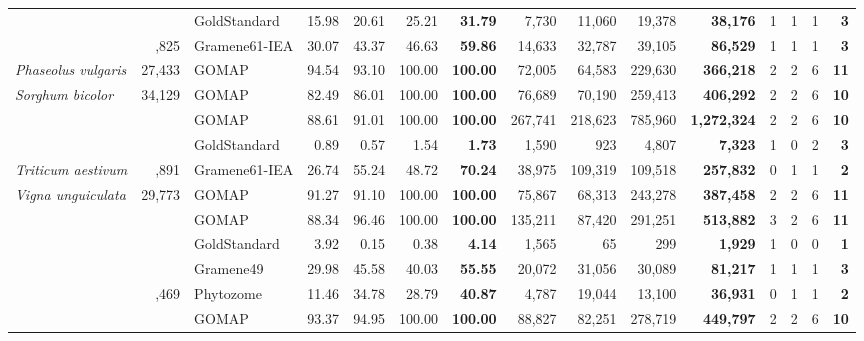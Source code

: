 \documentclass[utf8]{frontiersSCNS}
\begin{document}
\begin{table}[t]
{\begin{threeparttable}
\begin{tabular}{lrlrrr>{\bfseries}r|rrr>{\bfseries}r|rrr>{\bfseries}r}
 &  & GoldStandard & 15.98 & 20.61 & 25.21 & 31.79 & 7,730 & 11,060 & 19,378 & 38,176 & 1 & 1 & 1 & 3\\

\rowcolor{gray!6}  \multirow{-3}{*}{\raggedright\arraybackslash \textit{Oryza sativa}} & \multirow{-3}{*}{\raggedleft\arraybackslash 35,825} & Gramene61-IEA & 30.07 & 43.37 & 46.63 & 59.86 & 14,633 & 32,787 & 39,105 & 86,529 & 1 & 1 & 1 & 3\\
\cmidrule{1-15}
\textit{Phaseolus vulgaris} & 27,433 & GOMAP & 94.54 & 93.10 & 100.00 & 100.00 & 72,005 & 64,583 & 229,630 & 366,218 & 2 & 2 & 6 & 11\\
\cmidrule{1-15}
\rowcolor{gray!6}  \textit{Sorghum bicolor} & 34,129 & GOMAP & 82.49 & 86.01 & 100.00 & 100.00 & 76,689 & 70,190 & 259,413 & 406,292 & 2 & 2 & 6 & 10\\
\cmidrule{1-15}
 &  & GOMAP & 88.61 & 91.01 & 100.00 & 100.00 & 267,741 & 218,623 & 785,960 & 1,272,324 & 2 & 2 & 6 & 10\\

\rowcolor{gray!6}   &  & GoldStandard & 0.89 & 0.57 & 1.54 & 1.73 & 1,590 & 923 & 4,807 & 7,323 & 1 & 0 & 2 & 3\\

\multirow{-3}{*}{\raggedright\arraybackslash \textit{Triticum aestivum}} & \multirow{-3}{*}{\raggedleft\arraybackslash 107,891} & Gramene61-IEA & 26.74 & 55.24 & 48.72 & 70.24 & 38,975 & 109,319 & 109,518 & 257,832 & 0 & 1 & 1 & 2\\
\cmidrule{1-15}
\rowcolor{gray!6}  \textit{Vigna unguiculata} & 29,773 & GOMAP & 91.27 & 91.10 & 100.00 & 100.00 & 75,867 & 68,313 & 243,278 & 387,458 & 2 & 2 & 6 & 11\\
\cmidrule{1-15}
 &  & GOMAP & 88.34 & 96.46 & 100.00 & 100.00 & 135,211 & 87,420 & 291,251 & 513,882 & 3 & 2 & 6 & 11\\

\rowcolor{gray!6}   &  & GoldStandard & 3.92 & 0.15 & 0.38 & 4.14 & 1,565 & 65 & 299 & 1,929 & 1 & 0 & 0 & 1\\

 &  & Gramene49 & 29.98 & 45.58 & 40.03 & 55.55 & 20,072 & 31,056 & 30,089 & 81,217 & 1 & 1 & 1 & 3\\

\rowcolor{gray!6}  \multirow{-4}{*}{\raggedright\arraybackslash \textit{Zea mays} B73.v3} & \multirow{-4}{*}{\raggedleft\arraybackslash 39,469} & Phytozome & 11.46 & 34.78 & 28.79 & 40.87 & 4,787 & 19,044 & 13,100 & 36,931 & 0 & 1 & 1 & 2\\
\cmidrule{1-15}
 &  & GOMAP & 93.37 & 94.95 & 100.00 & 100.00 & 88,827 & 82,251 & 278,719 & 449,797 & 2 & 2 & 6 & 10\\


\end{tabular}
\end{threeparttable}}
\end{table}
\end{document}

